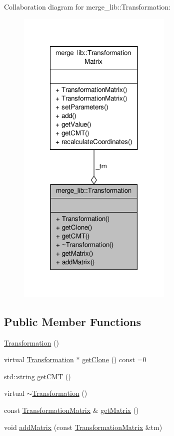 Collaboration diagram for merge\-\_\-lib\-:\-:Transformation\-:
\nopagebreak
\begin{figure}[H]
\begin{center}
\leavevmode
\includegraphics[width=210pt]{dc/d5e/classmerge__lib_1_1_transformation__coll__graph}
\end{center}
\end{figure}
\subsection*{Public Member Functions}
\begin{DoxyCompactItemize}
\item 
\hyperlink{classmerge__lib_1_1_transformation_a5813cb23332dd7bbf67611f875cf0574}{Transformation} ()
\item 
virtual \hyperlink{classmerge__lib_1_1_transformation}{Transformation} $\ast$ \hyperlink{classmerge__lib_1_1_transformation_a7ebaa86d0aa408c14090ebf4289d99eb}{get\-Clone} () const =0
\item 
std\-::string \hyperlink{classmerge__lib_1_1_transformation_a3f8b884f5f34bac3e9d99dabe0cb9d00}{get\-C\-M\-T} ()
\item 
virtual \hyperlink{classmerge__lib_1_1_transformation_a628be7acfee7f8d5f184c4ae01fd4301}{$\sim$\-Transformation} ()
\item 
const \hyperlink{classmerge__lib_1_1_transformation_matrix}{Transformation\-Matrix} \& \hyperlink{classmerge__lib_1_1_transformation_a322ddafc65ddaeea4737ccce05e8fa8e}{get\-Matrix} ()
\item 
void \hyperlink{classmerge__lib_1_1_transformation_a26c0fc679744c3f24803cb7ff1476120}{add\-Matrix} (const \hyperlink{classmerge__lib_1_1_transformation_matrix}{Transformation\-Matrix} \&tm)
\end{DoxyCompactItemize}
